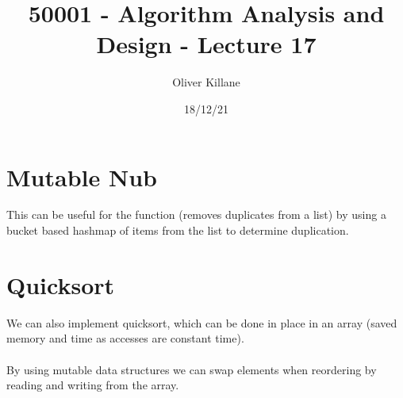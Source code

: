 \documentclass{report}
\title{50001 - Algorithm Analysis and Design - Lecture 17}
\author{Oliver Killane}
\date{18/12/21}
\begin{document}
\maketitle
{}

\section*{Mutable Nub}
This can be useful for the  function (removes duplicates from a list) by using a bucket based hashmap of items from the list to determine duplication.

\section*{Quicksort}
We can also implement quicksort, which can be done in place in an array
(saved memory and time as accesses are constant time).
\\
\\ By using mutable data structures we can swap elements when reordering by reading and writing from the array.
\end{document}
